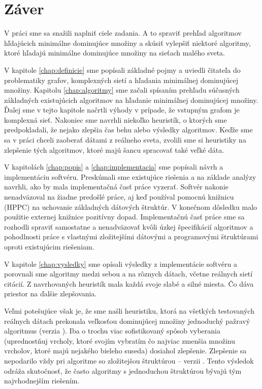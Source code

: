 \cleardoublepage
{}
{}
\chapter*{Záver}\label{chap:zaver}

V práci sme sa snažili naplniť ciele zadania. A to spraviť prehľad algoritmov 
hľdajúcich minimálne dominujúce množiny a skúsiť vylepšiť niektoré algoritmy, 
ktoré hľadajú minimálne dominujúce množiny na sieťach malého sveta. 

V kapitole \ref{chap:definicie} sme popísali základné pojmy a uviedli čitateľa 
do problematiky grafov, komplexných sietí a hľadania minimálnej dominujúcej 
množiny. Kapitolu \ref{chap:algoritmy} sme začali spísaním prehľadu súčasných 
základných existujúcich algoritmov na hľadanie minimálnej dominujúcej množiny. 
Ďalej sme v tejto kapitole načrtli výhody v prípade, že vstupným grafom je 
komplexná sieť. Nakoniec sme navrhli niekoľko heuristík, o ktorých sme 
predpokladali, že nejako zlepšia čas behu alebo výsledky algoritmov. Keďže 
sme sa v práci chceli zaoberať dátami z reálneho sveta, zvolili sme si 
heuristiky na zlepšenie tých algoritmov, ktoré majú šancu spracovať také veľké 
dáta.

V kapitolách \ref{chap:popis} a \ref{chap:implementacia} sme popísali návrh a 
implementáciu softvéru. Preskúmali sme existujúce riešenia a na základe analýzy 
navrhli, ako by mala implementačná časť práce vyzerať.
Softvér nakonie nenadväzoval na žiadne predošlé práce, aj keď 
používal pomocnú knižnicu (HPPC) na uchovanie základných dátových štruktúr. 
V konečnom dôsledku malo použitie externej knižnice pozitívny dopad. 
Implementačnú časť práce sme sa rozhodli spraviť samostatne a nenadväzovať 
kvôli úzkej špecifikácií algoritmov a pohodlnosti práce s vlastnými 
zložitejšími dátovými a programovými štruktúrami oproti existujúcim riešeniam.

V kapitole \ref{chap:vysledky} sme opísali výsledky z implementácie softvéru a 
porovnali sme algoritmy medzi sebou a na rôznych dátach, včetne reálnych sietí 
citácií. Z navrhovaných heuristík mala každá svoje slabé a silné miesta. 
Čo dáva priestor na ďalšie zlepšovania. 

Veľmi potešujúce však je, že sme našli heuristiku, ktorá na všetkých 
testovaných reálnych dátach prekonala veľkosťou dominujúcej množiny 
jednoduchý pažravý algoritmus (verzia ). Iba o trochu viac 
sofistikovaný spôsob vyberania (uprednostňuj vrcholy, ktoré svojím vybratím 
čo najviac zmenšia množinu vrcholov, ktoré majú nejakého bieleho suseda) 
dosiahol zlepšenie. Zlepšenie sa nepodarilo vždy pri algoritme so zložitejšou 
štruktúrou -- verzii .
Tento výsledok odráža skutočnosť, že často algoritmy s 
jednoduchou štruktúrou bývajú tým najvhodnejším riešením.

